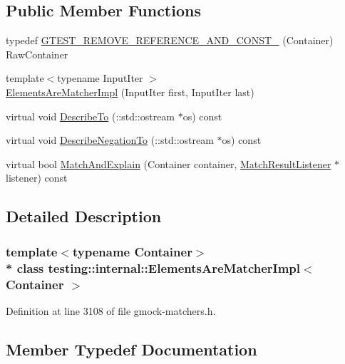 \subsection*{Public Member Functions}
\begin{DoxyCompactItemize}
\item 
typedef \hyperlink{classtesting_1_1internal_1_1_elements_are_matcher_impl_a9492f6be7fe09e26eb7c5c00ff18062b}{G\+T\+E\+S\+T\+\_\+\+R\+E\+M\+O\+V\+E\+\_\+\+R\+E\+F\+E\+R\+E\+N\+C\+E\+\_\+\+A\+N\+D\+\_\+\+C\+O\+N\+S\+T\+\_\+} (Container) Raw\+Container
\item 
{\footnotesize template$<$typename Input\+Iter $>$ }\\\hyperlink{classtesting_1_1internal_1_1_elements_are_matcher_impl_abfe21bd90e0c085d4a171e22f1e2cc09}{Elements\+Are\+Matcher\+Impl} (Input\+Iter first, Input\+Iter last)
\item 
virtual void \hyperlink{classtesting_1_1internal_1_1_elements_are_matcher_impl_a1c5086b897fb07cf3f2a922048faef28}{Describe\+To} (\+::std\+::ostream $\ast$os) const 
\item 
virtual void \hyperlink{classtesting_1_1internal_1_1_elements_are_matcher_impl_a444dc46c3c78f6c4c9e45544c6dee95d}{Describe\+Negation\+To} (\+::std\+::ostream $\ast$os) const 
\item 
virtual bool \hyperlink{classtesting_1_1internal_1_1_elements_are_matcher_impl_a1d6060dd6c8e9ce40ebb9b1825902292}{Match\+And\+Explain} (Container container, \hyperlink{classtesting_1_1_match_result_listener}{Match\+Result\+Listener} $\ast$listener) const 
\end{DoxyCompactItemize}


\subsection{Detailed Description}
\subsubsection*{template$<$typename Container$>$\\*
class testing\+::internal\+::\+Elements\+Are\+Matcher\+Impl$<$ Container $>$}



Definition at line 3108 of file gmock-\/matchers.\+h.



\subsection{Member Typedef Documentation}
